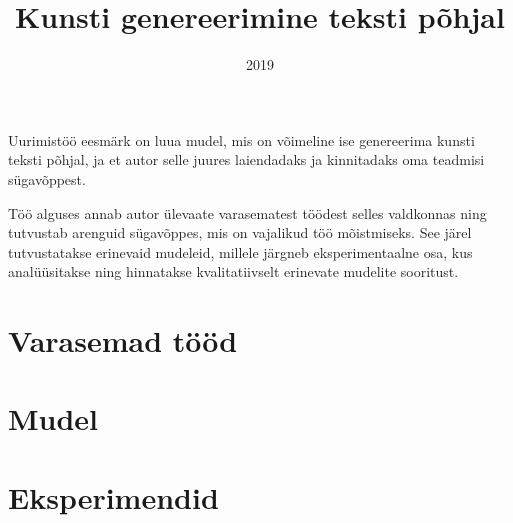 \documentclass{vilgym}
\title{Kunsti genereerimine teksti põhjal}
\date{2019}
\begin{document}
    \maketitle
    \tableofcontents

    Uurimistöö eesmärk on luua mudel, mis on võimeline ise genereerima kunsti teksti põhjal, ja et autor selle juures laiendadaks ja kinnitadaks oma teadmisi sügavõppest.

    Töö alguses annab autor ülevaate varasematest töödest selles valdkonnas ning tutvustab arenguid sügavõppes, mis on vajalikud töö mõistmiseks. See järel tutvustatakse erinevaid mudeleid, millele järgneb eksperimentaalne osa, kus analüüsitakse ning hinnatakse kvalitatiivselt erinevate mudelite sooritust. 
    
    \section{Varasemad tööd}

    \section{Mudel}

    \section{Eksperimendid}


\end{document}
